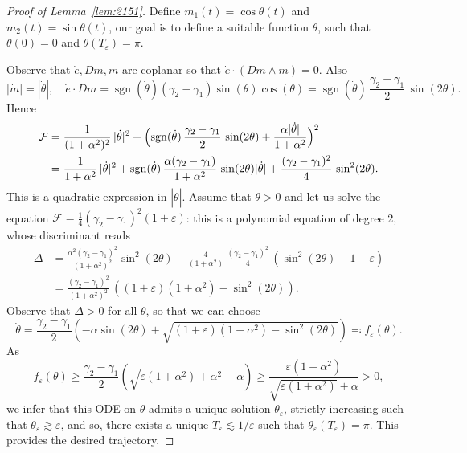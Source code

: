 \documentclass[10pt]{amsart}
\theoremstyle{definition}
\begin{document}
\begin{proof}[Proof of Lemma~\ref{lem:2151}]
Define $m_1(t) = \cos \theta(t)$ and $m_2(t) = \sin \theta(t)$, our goal is to define a suitable function $\theta$, such that $\theta(0)=0$ and $\theta(T_\varepsilon) = \pi$.

Observe that $\dot e, Dm, m$ are coplanar so that $\dot e\cdot (Dm\wedge m) =0$. Also
\[ |\dot m| = |\dot \theta|, \quad \dot e \cdot Dm = {\operatorname{sgn} (\dot{\theta})} (\gamma_2-\gamma_1) \sin(\theta) \cos(\theta) = \operatorname{sgn} (\dot{\theta})\, \frac{\gamma_2-\gamma_1}{2}\, \sin(2\theta). \]
Hence
\begin{align*}
\mathcal F &= \frac{1}{(1+\alpha^2)^2}\,|\dot \theta|^2 + \Bigl({\operatorname{sgn} (\dot{\theta})}\, \frac{\gamma_2-\gamma_1}{2}\, \sin(2\theta) + \frac{\alpha |\dot \theta|}{1+\alpha^2} \Bigr)^2 \\
& = \frac{1}{1+\alpha^2}\,|\dot \theta|^2 + {\operatorname{sgn} (\dot{\theta})}\, \frac{\alpha (\gamma_2-\gamma_1)}{1+\alpha^2}\, \sin(2\theta) |\dot \theta| + \frac{(\gamma_2-\gamma_1)^2}{4}\, \sin^2(2\theta).
\end{align*}
This is a quadratic expression in $|\dot \theta|$. {Assume that $\dot{\theta} > 0$ and let} us solve the equa\-tion $\mathcal F = \frac{1}{4} (\gamma_2 - \gamma_1)^2 (1+\varepsilon)$: this is a polynomial equation of degree 2, whose discriminant reads
\begin{align*}
\Delta & = \frac{\alpha^2 (\gamma_2-\gamma_1)^2}{(1+\alpha^2)^2} \sin^2(2\theta) - \frac{4}{ (1+\alpha^2)}\, \frac{(\gamma_2-\gamma_1)^2}{4}\, (\sin^2(2\theta) - 1 -\varepsilon) \\
& =\frac{(\gamma_2-\gamma_1)^2}{(1+\alpha^2)^2}\, {\left((1+ \varepsilon) (1+\alpha^2) - \sin^2(2\theta) \right)}.
\end{align*}
Observe that $\Delta >0$ for all $\theta$, so that we can choose
\[
\dot \theta = \frac{\gamma_2-\gamma_1}{2} \left(-\alpha \sin(2\theta) + \sqrt{ (1+ \varepsilon) (1+\alpha^2) - \sin^2(2\theta)}\right) \eqqcolon f_\varepsilon (\theta).
\]
As
\[ f_\varepsilon (\theta) \geq \frac{\gamma_2-\gamma_1}{2} \left({ \sqrt{\varepsilon (1 + \alpha^2) + \alpha^2} - \alpha} \right) \geq \frac{ \varepsilon (1 + \alpha^2)}{\sqrt{ \varepsilon (1 + \alpha^2)} + \alpha}>0, \] we infer that this ODE on $\theta$ admits a unique solution $\theta_\varepsilon $, strictly increasing such that $\dot \theta_\varepsilon \gtrsim \varepsilon $, and so, there exists a unique $T_\varepsilon \lesssim 1/\varepsilon $ such that $\theta_\varepsilon (T_\varepsilon) = \pi$. This provides the desired trajectory.
\end{proof}
\end{document}
